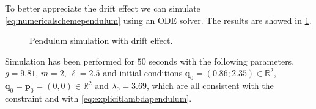 To better appreciate the drift effect we can simulate
\cref{eq:numericalschemependulum} using an ODE solver.
The results are showed in \cref{fig:trackingerrosr}.
\begin{figure}[htbp]
	\centering
	\caption{Pendulum simulation with drift effect.}
	\label{fig:trackingerrosr}
\end{figure}
Simulation has been performed for $50$ seconds with the following
parameters, $g = 9.81$, $m=2$, $\ell=2.5$ and initial conditions
$\bm{q}_{0} = (0.86; 2.35)\in\mathbb{R}^{2}$,
$\dot{\bm{q}}_{0} = \bm{p}_{0} = (0,0)\in\mathbb{R}^{2}$
and $\lambda_{0} = 3.69$, which are all consistent with
the constraint and with \cref{eq:explicitlambdapendulum}.

\endinput
